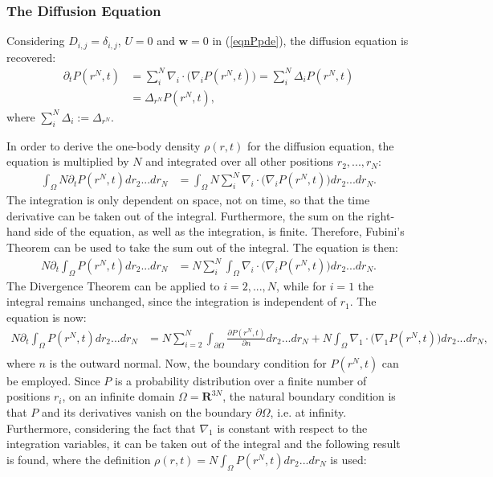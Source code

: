 \subsubsection*{The Diffusion Equation}
Considering $D_{i,j}=\delta_{i,j}$, $U=0$ and $\mathbf{w}=0$ in (\ref{eqnPpde}), the diffusion equation is recovered:
\begin{align*} 
\partial_t P(r^N,t) &= \sum_{i}^N \nabla_i \cdot \bigg(\nabla_i   P(r^N,t) \bigg)= \sum_{i}^N \Delta_i P(r^N,t)\\
&= \Delta_{r^N} P(r^N,t),
\end{align*}
where $\sum_{i}^N \Delta_i := \Delta_{r^N}$.

In order to derive the one-body density $\rho(r,t)$ for the diffusion equation, the equation is multiplied by $N$ and integrated over all other positions $r_2,...,r_N$:
\begin{align*} 
\int_\Omega N \partial_t P(r^N,t)dr_2...dr_N &= \int_\Omega N \sum_{i}^N \nabla_i \cdot \bigg(\nabla_i   P(r^N,t) \bigg)dr_2...dr_N.
\end{align*}
The integration is only dependent on space, not on time, so that the time derivative can be taken out of the integral. Furthermore, the sum on the right-hand side of the equation, as well as the integration, is finite. Therefore, Fubini's Theorem can be used to take the sum out of the integral. The equation is then:
\begin{align*} 
N \partial_t \int_\Omega P(r^N,t)dr_2...dr_N &=N \sum_{i}^N \int_\Omega  \nabla_i \cdot \bigg(\nabla_i   P(r^N,t) \bigg)dr_2...dr_N.
\end{align*}
The Divergence Theorem can be applied to $i=2,...,N$, while for $i=1$ the integral remains unchanged, since the integration is independent of $r_1$. The equation is now:
\begin{align*} 
N \partial_t \int_\Omega P(r^N,t)dr_2...dr_N &=N \sum_{i=2}^N \int_{\partial \Omega} \frac{\partial P(r^N,t)}{\partial n} dr_2...dr_N + N\int_\Omega \nabla_1 \cdot \bigg(\nabla_1   P(r^N,t) \bigg)dr_2...dr_N,\\
\end{align*}
where $n$ is the outward normal. 
Now, the boundary condition for $P(r^N,t)$ can be employed. Since $P$ is a probability distribution over a finite number of positions $r_i$, on an infinite domain $\Omega= \mathbf{R}^{3N}$, the natural boundary condition is that $P$ and its derivatives vanish on the boundary $\partial \Omega$, i.e. at infinity.
Furthermore, considering the fact that $\nabla_1$ is constant with respect to the integration variables, it can be taken out of the integral and the following result is found, where the definition $\rho(r,t)= N \int_\Omega P(r^N,t)dr_2...dr_N$ is used:
